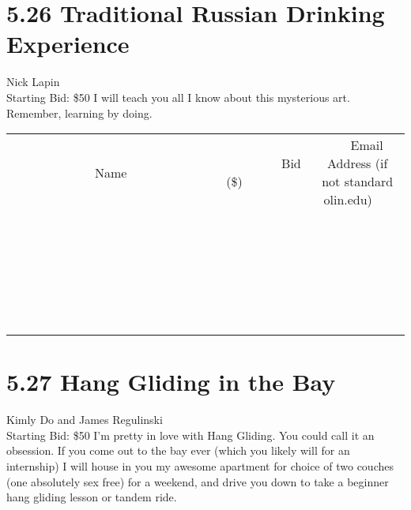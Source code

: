 \documentclass[11pt]{article}
\begin{document}
\section*{5.26 Traditional Russian Drinking Experience}
Nick Lapin
\\
Starting Bid: \$50
\newline
I will teach you all I know about this mysterious art. Remember, learning by doing.
\\[6ex]
\begin{tabular}{c c c}
~~~~~~~~~~~~~Name~~~~~~~~~~~~~ & ~~~~~~~~~Bid (\$)~~~~~~~~~  & ~~~Email Address (if not standard olin.edu)~~~\\
 & & \\
\hline
 & & \\
\hline
 & & \\
\hline
 & & \\
\hline
 & & \\
\hline
 & & \\
\hline
 & & \\
\hline
 & & \\
\hline
 & & \\
\hline
 & & \\
\hline
 & & \\
\hline
 & & \\
\hline
 & & \\
\hline
 & & \\
\hline
 & & \\
\hline
 & & \\
\hline
 & & \\
\hline
 & & \\
\hline
 & & \\
\hline
 & & \\
\hline
 & & \\
\hline
 & & \\
\hline
 & & \\
\hline
 & & \\
\hline
 & & \\
\hline
 & & \\
\hline
\end{tabular}
\newpage
\section*{5.27 Hang Gliding in the Bay}
Kimly Do and James Regulinski
\\
Starting Bid: \$50
\newline
I'm pretty in love with Hang Gliding. You could call it an obsession. If you come out to the bay ever (which you likely will for an internship) I will house in you my awesome apartment for choice of two couches (one absolutely sex free) for a weekend, and drive you down to take a beginner hang gliding lesson or tandem ride.
\end{document}

